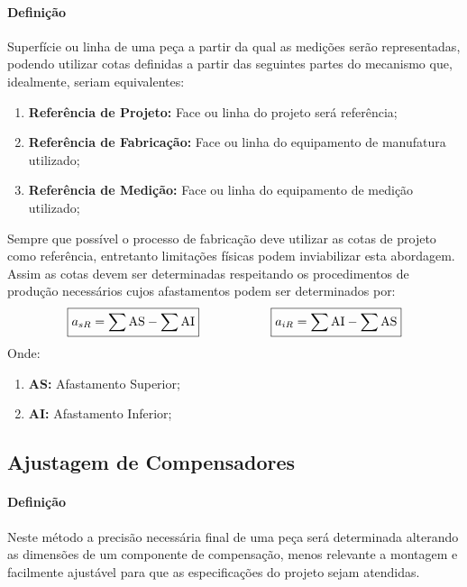 \documentclass{article}
\begin{document}
            \paragraph{Definição}Superfície ou linha de uma peça a partir da qual as medições serão representadas, podendo utilizar cotas definidas a partir das seguintes partes do mecanismo que, idealmente, seriam equivalentes:
                \begin{enumerate}[noitemsep]
                    \item \textbf{Referência de Projeto:} Face ou linha do projeto será referência;
                    \item \textbf{Referência de Fabricação:} Face ou linha do equipamento de manufatura utilizado;
                    \item \textbf{Referência de Medição:} Face ou linha do equipamento de medição utilizado;
                \end{enumerate}
            Sempre que possível o processo de fabricação deve utilizar as cotas de projeto como referência, entretanto limitações físicas podem inviabilizar esta abordagem. Assim as cotas devem ser determinadas respeitando os procedimentos de produção necessários cujos afastamentos podem ser determinados por:
                \begin{equation}
                    \boxed{
                        a_{sR} = \sum\text{AS} - \sum\text{AI}
                    }
                    \hspace{20mm}
                    \boxed{
                        a_{iR} = \sum\text{AI} - \sum\text{AS}
                    }
                \end{equation}
            Onde:
                \begin{enumerate}[noitemsep]
                    \item \textbf{AS:} Afastamento Superior;
                    \item \textbf{AI:} Afastamento Inferior;
                \end{enumerate}

        \subsection{Ajustagem de Compensadores}
            \paragraph{Definição}Neste método a precisão necessária final de uma peça será determinada alterando as dimensões de um componente de compensação, menos relevante a montagem e facilmente ajustável para que as especificações do projeto sejam atendidas.
\end{document}
